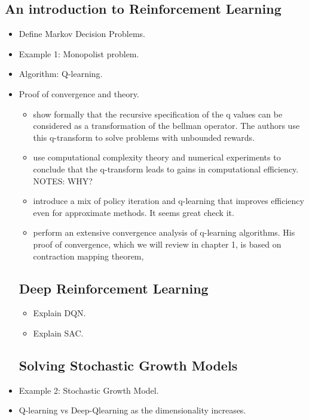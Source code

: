 \documentclass[11pt,english]{article}
\begin{document}
\subsection{An introduction to Reinforcement Learning}
\begin{itemize}
\item Define Markov Decision Problems.
\item Example 1: Monopolist problem.
\item Algorithm: Q-learning.
\item Proof of convergence and theory.
\begin{itemize}
\item \citet{ma2020} show formally that the recursive specification of
the q values can be considered as a transformation of the bellman
operator. The authors use this q-transform to solve problems with
unbounded rewards.
\item \citet{ma2021} use computational complexity theory and numerical
experiments to conclude that the q-transform leads to gains in computational
efficiency. NOTES: WHY?
\item \citet{bertsekas2012} introduce a mix of policy iteration and q-learning
that improves efficiency even for approximate methods. It seems great
check it.
\item \citet{tsitsiklis1994} perform an extensive convergence analysis
of q-learning algorithms. His proof of convergence, which we will
review in chapter 1, is based on contraction mapping theorem,
\end{itemize}

\subsection{Deep Reinforcement Learning}

\begin{itemize}
	\item Explain DQN.
	\item Explain SAC.
\end{itemize}

\subsection{Solving Stochastic Growth Models}
\item Example 2: Stochastic Growth Model.
\item Q-learning vs Deep-Qlearning as the dimensionality increases.
\end{itemize}
\end{document}
